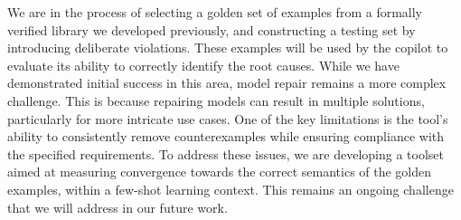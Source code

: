 %
%

We are in the process of selecting a golden set of examples from a formally verified library we developed previously, and constructing a testing set by introducing deliberate violations. These examples will be used by the copilot to evaluate its ability to correctly identify the root causes. While we have demonstrated initial success in this area, model repair remains a more complex challenge. This is because repairing models can result in multiple solutions, particularly for more intricate use cases. One of the key limitations is the tool's ability to consistently remove counterexamples while ensuring compliance with the specified requirements. To address these issues, we are developing a toolset aimed at measuring convergence towards the correct semantics of the golden examples, within a few-shot learning context. This remains an ongoing challenge that we will address in our future work. %


